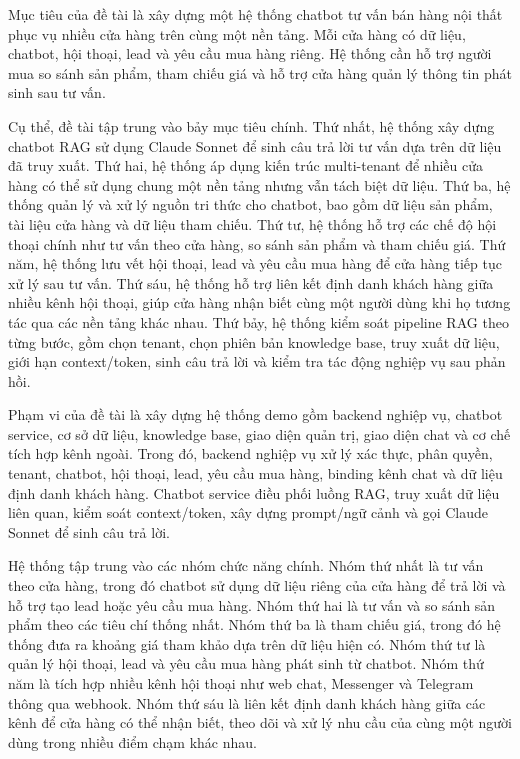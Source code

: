 \documentclass[../DoAn.tex]{subfiles}
\begin{document}
Mục tiêu của đề tài là xây dựng một hệ thống chatbot tư vấn bán hàng nội thất phục vụ nhiều cửa hàng trên cùng một nền tảng. Mỗi cửa hàng có dữ liệu, chatbot, hội thoại, lead và yêu cầu mua hàng riêng. Hệ thống cần hỗ trợ người mua so sánh sản phẩm, tham chiếu giá và hỗ trợ cửa hàng quản lý thông tin phát sinh sau tư vấn.

Cụ thể, đề tài tập trung vào bảy mục tiêu chính. Thứ nhất, hệ thống xây dựng chatbot RAG sử dụng Claude Sonnet để sinh câu trả lời tư vấn dựa trên dữ liệu đã truy xuất. Thứ hai, hệ thống áp dụng kiến trúc multi-tenant để nhiều cửa hàng có thể sử dụng chung một nền tảng nhưng vẫn tách biệt dữ liệu. Thứ ba, hệ thống quản lý và xử lý nguồn tri thức cho chatbot, bao gồm dữ liệu sản phẩm, tài liệu cửa hàng và dữ liệu tham chiếu. Thứ tư, hệ thống hỗ trợ các chế độ hội thoại chính như tư vấn theo cửa hàng, so sánh sản phẩm và tham chiếu giá. Thứ năm, hệ thống lưu vết hội thoại, lead và yêu cầu mua hàng để cửa hàng tiếp tục xử lý sau tư vấn. Thứ sáu, hệ thống hỗ trợ liên kết định danh khách hàng giữa nhiều kênh hội thoại, giúp cửa hàng nhận biết cùng một người dùng khi họ tương tác qua các nền tảng khác nhau. Thứ bảy, hệ thống kiểm soát pipeline RAG theo từng bước, gồm chọn tenant, chọn phiên bản knowledge base, truy xuất dữ liệu, giới hạn context/token, sinh câu trả lời và kiểm tra tác động nghiệp vụ sau phản hồi.

Phạm vi của đề tài là xây dựng hệ thống demo gồm backend nghiệp vụ, chatbot service, cơ sở dữ liệu, knowledge base, giao diện quản trị, giao diện chat và cơ chế tích hợp kênh ngoài. Trong đó, backend nghiệp vụ xử lý xác thực, phân quyền, tenant, chatbot, hội thoại, lead, yêu cầu mua hàng, binding kênh chat và dữ liệu định danh khách hàng. Chatbot service điều phối luồng RAG, truy xuất dữ liệu liên quan, kiểm soát context/token, xây dựng prompt/ngữ cảnh và gọi Claude Sonnet để sinh câu trả lời.

Hệ thống tập trung vào các nhóm chức năng chính. Nhóm thứ nhất là tư vấn theo cửa hàng, trong đó chatbot sử dụng dữ liệu riêng của cửa hàng để trả lời và hỗ trợ tạo lead hoặc yêu cầu mua hàng. Nhóm thứ hai là tư vấn và so sánh sản phẩm theo các tiêu chí thống nhất. Nhóm thứ ba là tham chiếu giá, trong đó hệ thống đưa ra khoảng giá tham khảo dựa trên dữ liệu hiện có. Nhóm thứ tư là quản lý hội thoại, lead và yêu cầu mua hàng phát sinh từ chatbot. Nhóm thứ năm là tích hợp nhiều kênh hội thoại như web chat, Messenger và Telegram thông qua webhook. Nhóm thứ sáu là liên kết định danh khách hàng giữa các kênh để cửa hàng có thể nhận biết, theo dõi và xử lý nhu cầu của cùng một người dùng trong nhiều điểm chạm khác nhau.
\end{document}
